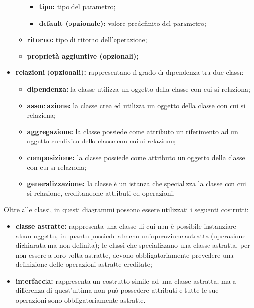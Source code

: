 \begin{itemize}[leftmargin=1.5cm]
\begin{itemize}
\begin{itemize}
									\item \textbf{tipo:} tipo del parametro;
									\item \textbf{default (opzionale):} valore predefinito del parametro;
								\end{itemize}
								\item \textbf{ritorno:} tipo di ritorno dell'operazione;
								\item \textbf{proprietà aggiuntive (opzionali);}
							\end{itemize}
							\item \textbf{relazioni (opzionali):} rappresentano il grado di dipendenza tra due classi:
							\begin{itemize}
								\item \textbf{dipendenza:} la classe utilizza un oggetto della classe con cui si relaziona;
								\item \textbf{associazione:} la classe crea ed utilizza un oggetto della classe con cui si relaziona;
								\item \textbf{aggregazione:} la classe possiede come attributo un riferimento ad un oggetto condiviso della classe con cui si relazione;
								\item \textbf{composizione:} la classe possiede come attributo un oggetto della classe con cui si relaziona;
								\item \textbf{generalizzazione:} la classe è un istanza che specializza la classe con cui si relazione, ereditandone attributi ed operazioni.
							\end{itemize}
						\end{itemize}

						\hangindent=0.6cm Oltre alle classi, in questi diagrammi possono essere utilizzati i seguenti costrutti:
						\begin{itemize}[leftmargin=1.5cm]
							\item \textbf{classe astratte:} rappresenta una classe di cui non è possibile instanziare alcun oggetto, in quanto possiede almeno un'operazione astratta (operazione dichiarata ma non definita); le classi che specializzano una classe astratta, per non essere a loro volta astratte, devono obbligatoriamente prevedere una definizione delle operazioni astratte ereditate;
							\item \textbf{interfaccia:} rappresenta un costrutto simile ad una classe astratta, ma a differenza di quest'ultima non può possedere attributi e tutte le sue operazioni sono obbligatoriamente astratte.
						\end{itemize}

